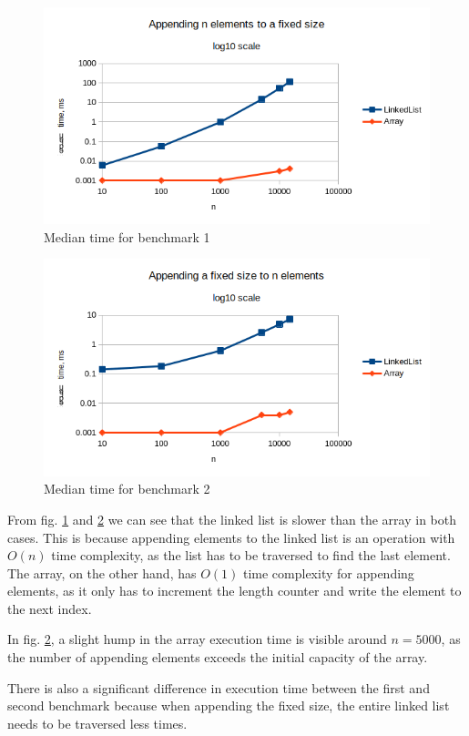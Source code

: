 \documentclass[a4paper,11pt]{article}
\begin{document}
    \begin{figure}[H]
        \centering
        \includegraphics[width=\textwidth]{b1.png}
        \caption{Median time for benchmark 1}
        \label{fig:b1}
    \end{figure}

    \begin{figure}[H]
        \centering
        \includegraphics[width=\textwidth]{b2.png}
        \caption{Median time for benchmark 2}
        \label{fig:b2}
    \end{figure}

    From fig. \ref{fig:b1} and \ref{fig:b2} we can see that the linked list is slower than the array in both cases. This is because appending elements to the linked list is an operation with $O(n)$ time complexity, as the list has to be traversed to find the last element. The array, on the other hand, has $O(1)$ time complexity for appending elements, as it only has to increment the length counter and write the element to the next index.

    In fig. \ref{fig:b2}, a slight hump in the array execution time is visible around $n=5000$, as the number of appending elements exceeds the initial capacity of the array.

    There is also a significant difference in execution time between the first and second benchmark because when appending the fixed size, the entire linked list needs to be traversed less times.
\end{document}
